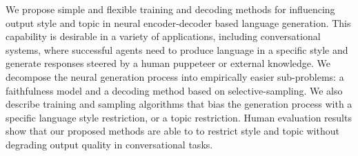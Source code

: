We propose simple and flexible training and decoding methods for influencing output style and topic in neural encoder-decoder based language generation. This capability is desirable in a variety of applications, including conversational systems, where successful agents need to produce language in a specific style and generate responses steered by a human puppeteer or external knowledge. We decompose the neural generation process into empirically easier sub-problems: a faithfulness model and a decoding method based on selective-sampling. We also describe training and sampling algorithms that bias the generation process with a specific language style restriction, or a topic restriction. Human evaluation results show that our proposed methods are able to to restrict style and topic without degrading output quality in conversational tasks.

